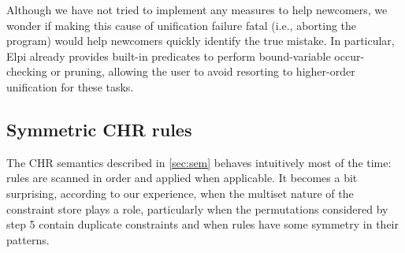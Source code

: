 \documentclass{these-ISSS}
\begin{document}
Although we have not tried to implement any measures to help newcomers, we
wonder if making this cause of unification failure fatal (i.e., aborting the
program) would help newcomers quickly identify the true mistake. In
particular, Elpi already provides built-in predicates to perform
bound-variable occur-checking or pruning, allowing the user to avoid resorting
to higher-order unification for these tasks.

\subsection{Symmetric CHR rules}

The CHR semantics described in \cref{sec:sem} behaves intuitively most of the
time: rules are scanned in order and applied when applicable. It becomes a bit
surprising, according to our experience, when the multiset nature of the
constraint store plays a role, particularly when the permutations
considered by step 5 contain
duplicate constraints and when rules have some symmetry in their patterns.
\end{document}
